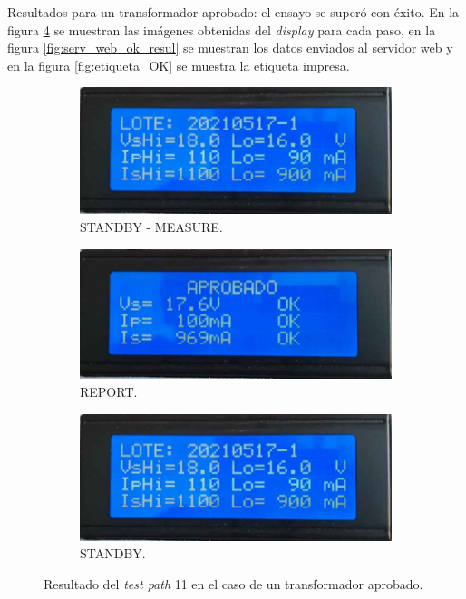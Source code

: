 Resultados para un transformador aprobado: el ensayo se superó con éxito. En la figura \ref{fig:pruConf_11_res_b} se muestran las imágenes obtenidas del \textit{display} para cada paso, en la figura \ref{fig:serv_web_ok_resul} se muestran los datos enviados al servidor web y en la figura \ref{fig:etiqueta_OK} se muestra la etiqueta impresa.

\pagebreak

\begin{figure}[!htpb]
     \centering
     \begin{subfigure}[b]{0.4\textwidth}
         \centering
         \includegraphics[width=1.1\textwidth]{./Figures/pru_pass.jpeg}
         \caption{STANDBY - MEASURE.}
         \label{fig:pruConf_11_1_b}
     \end{subfigure}
          \hfill
     \begin{subfigure}[b]{0.4\textwidth}
         \centering
         \includegraphics[width=1.1\textwidth]{./Figures/aprobado.jpeg}
         \caption{REPORT.}
         \label{fig:pruConf_11_2_b}
     \end{subfigure}
           \hfill
     \begin{subfigure}[b]{0.4\textwidth}
         \centering
         \includegraphics[width=1.1\textwidth]{./Figures/pru_pass.jpeg}
         \caption{STANDBY.}
         \label{fig:pruConf_11_3_b}
     \end{subfigure}
        \caption{Resultado del \textit{test path} 11 en el caso de un transformador aprobado.}
        \label{fig:pruConf_11_res_b}
\end{figure}


